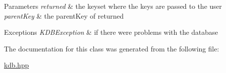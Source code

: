 \begin{DoxyParams}{Parameters}
{\em returned} & the keyset where the keys are passed to the user \\
\hline
{\em parent\+Key} & the parent\+Key of returned\\
\hline
\end{DoxyParams}

\begin{DoxyExceptions}{Exceptions}
{\em K\+D\+B\+Exception} & if there were problems with the database \\
\hline
\end{DoxyExceptions}


The documentation for this class was generated from the following file\+:\begin{DoxyCompactItemize}
\item 
\hyperlink{kdb_8hpp}{kdb.\+hpp}\end{DoxyCompactItemize}
